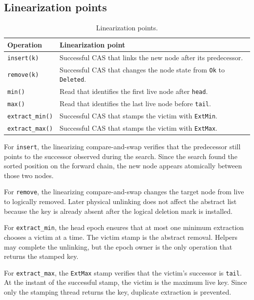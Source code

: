 \documentclass[a4paper,11pt]{article}
\newcommand{\CAS}{\textsc{CAS}}
\newcommand{\code}[1]{\texttt{#1}}
\begin{document}
\subsection{Linearization points}

\begin{table}[H]
\centering
\caption{Linearization points.}
\label{tab:linearization}
\begin{tabular}{ll}
\toprule
Operation & Linearization point \\
\midrule
\code{insert(k)} & Successful \CAS{} that links the new node after its predecessor. \\
\code{remove(k)} & Successful \CAS{} that changes the node state from \code{Ok} to \code{Deleted}. \\
\code{min()} & Read that identifies the first live node after \code{head}. \\
\code{max()} & Read that identifies the last live node before \code{tail}. \\
\code{extract\_min()} & Successful \CAS{} that stamps the victim with \code{ExtMin}. \\
\code{extract\_max()} & Successful \CAS{} that stamps the victim with \code{ExtMax}. \\
\bottomrule
\end{tabular}
\end{table}

For \code{insert}, the linearizing compare-and-swap verifies that the predecessor still points to the successor observed during the search. Since the search found the sorted position on the forward chain, the new node appears atomically between those two nodes.

For \code{remove}, the linearizing compare-and-swap changes the target node from live to logically removed. Later physical unlinking does not affect the abstract list because the key is already absent after the logical deletion mark is installed.

For \code{extract\_min}, the head epoch ensures that at most one minimum extraction chooses a victim at a time. The victim stamp is the abstract removal. Helpers may complete the unlinking, but the epoch owner is the only operation that returns the stamped key.

For \code{extract\_max}, the \code{ExtMax} stamp verifies that the victim's successor is \code{tail}. At the instant of the successful stamp, the victim is the maximum live key. Since only the stamping thread returns the key, duplicate extraction is prevented.
\end{document}
